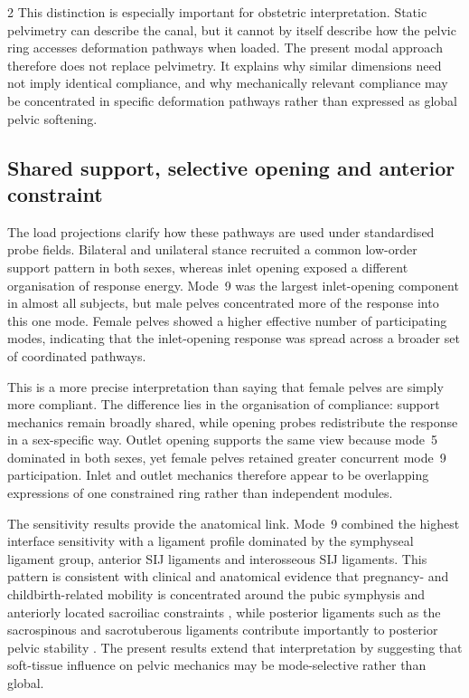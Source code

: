 \documentclass[openacc]{rsproca_new}
\begin{document}
\begin{multicols}{2}
This distinction is especially important for obstetric interpretation. Static pelvimetry can describe the canal, but it cannot by itself describe how the pelvic ring accesses deformation pathways when loaded. The present modal approach therefore does not replace pelvimetry. It explains why similar dimensions need not imply identical compliance, and why mechanically relevant compliance may be concentrated in specific deformation pathways rather than expressed as global pelvic softening.

\subsection{Shared support, selective opening and anterior constraint}

The load projections clarify how these pathways are used under standardised probe fields. Bilateral and unilateral stance recruited a common low-order support pattern in both sexes, whereas inlet opening exposed a different organisation of response energy. Mode~9 was the largest inlet-opening component in almost all subjects, but male pelves concentrated more of the response into this one mode. Female pelves showed a higher effective number of participating modes, indicating that the inlet-opening response was spread across a broader set of coordinated pathways.

This is a more precise interpretation than saying that female pelves are simply more compliant. The difference lies in the organisation of compliance: support mechanics remain broadly shared, while opening probes redistribute the response in a sex-specific way. Outlet opening supports the same view because mode~5 dominated in both sexes, yet female pelves retained greater concurrent mode~9 participation. Inlet and outlet mechanics therefore appear to be overlapping expressions of one constrained ring rather than independent modules.

The sensitivity results provide the anatomical link. Mode~9 combined the highest interface sensitivity with a ligament profile dominated by the symphyseal ligament group, anterior SIJ ligaments and interosseous SIJ ligaments. This pattern is consistent with clinical and anatomical evidence that pregnancy- and childbirth-related mobility is concentrated around the pubic symphysis and anteriorly located sacroiliac constraints \cite{Damen2001,Pires2015,Cicek2015,Fiani2021}, while posterior ligaments such as the sacrospinous and sacrotuberous ligaments contribute importantly to posterior pelvic stability \cite{Hammer2019,Aldabe2019}. The present results extend that interpretation by suggesting that soft-tissue influence on pelvic mechanics may be mode-selective rather than global.


\end{multicols}
\end{document}

